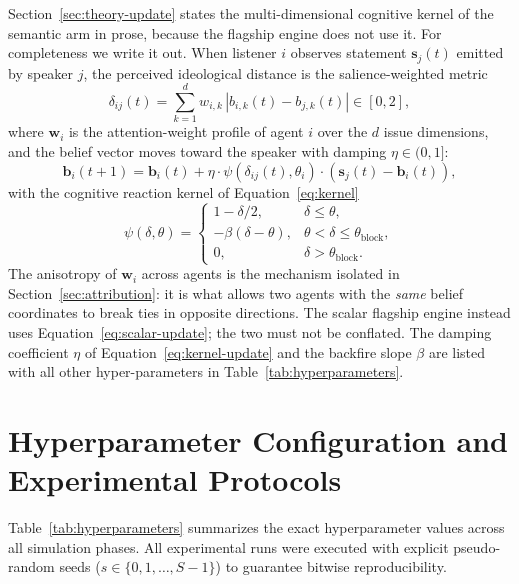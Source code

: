 Section~\ref{sec:theory-update} states the multi-dimensional cognitive kernel of the semantic
arm in prose, because the flagship engine does not use it. For completeness we write it
out. When listener $i$ observes statement $\mathbf{s}_j(t)$ emitted by speaker $j$, the
perceived ideological distance is the salience-weighted metric
\begin{equation}
    \delta_{ij}(t) = \sum_{k=1}^{d} w_{i,k} \, |b_{i,k}(t) - b_{j,k}(t)| \in [0, 2],
    \label{eq:dissonance}
\end{equation}
where $\mathbf{w}_i$ is the attention-weight profile of agent $i$ over the $d$ issue
dimensions, and the belief vector moves toward the speaker with damping $\eta \in (0, 1]$:
\begin{equation}
    \mathbf{b}_i(t+1) = \mathbf{b}_i(t) + \eta \cdot \psi(\delta_{ij}(t), \theta_i) \cdot (\mathbf{s}_j(t) - \mathbf{b}_i(t)),
    \label{eq:kernel-update}
\end{equation}
with the cognitive reaction kernel of Equation~\ref{eq:kernel}
\begin{equation}
    \psi(\delta, \theta) =
    \begin{cases}
        1 - \delta / 2, & \delta \leq \theta, \\
        -\beta (\delta - \theta), & \theta < \delta \leq \theta_{\mathrm{block}}, \\
        0, & \delta > \theta_{\mathrm{block}} .
    \end{cases}
    \label{eq:kernel}
\end{equation}
The anisotropy of $\mathbf{w}_i$ across agents is the mechanism isolated in
Section~\ref{sec:attribution}: it is what allows two agents with the \emph{same} belief
coordinates to break ties in opposite directions. The scalar flagship engine instead
uses Equation~\eqref{eq:scalar-update}; the two must not be conflated. The damping
coefficient $\eta$ of Equation~\ref{eq:kernel-update} and the backfire slope $\beta$ are
listed with all other hyper-parameters in Table~\ref{tab:hyperparameters}.

\section{Hyperparameter Configuration and Experimental Protocols}
\label{app:hyperparams}

Table~\ref{tab:hyperparameters} summarizes the exact hyperparameter values across all simulation phases. All experimental runs were executed with explicit pseudo-random seeds ($s \in \{0, 1, \dots, S-1\}$) to guarantee bitwise reproducibility.

